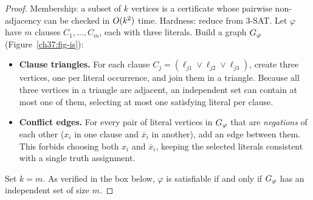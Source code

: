 \begin{proof}
Membership: a subset of $k$ vertices is a certificate whose pairwise non-adjacency can be checked
in $O(k^2)$ time. Hardness: reduce from \textsc{3-SAT}. Let $\varphi$ have $m$
clauses $C_1,\dots,C_m$, each with three literals. Build a graph $G_\varphi$ (Figure~\ref{ch37:fig-is}):

\begin{itemize}
  \item \textbf{Clause triangles.} For each clause $C_j=(\ell_{j1}\vee
        \ell_{j2}\vee \ell_{j3})$, create three vertices, one per literal
        occurrence, and join them in a triangle. Because all three vertices in a triangle are adjacent, an independent set can contain at most one of them, selecting at most one
        satisfying literal per clause.
  \item \textbf{Conflict edges.} For every pair of literal vertices in $G_\varphi$ that are
        \emph{negations} of each other ($x_i$ in one clause and $\bar{x}_i$ in
        another), add an edge between them. This forbids choosing both $x_i$ and $\bar{x}_i$,
        keeping the selected literals consistent with a single truth assignment.
\end{itemize}

Set $k=m$. As verified in the box below, $\varphi$ is satisfiable if and only if $G_\varphi$ has an
independent set of size $m$.
\end{proof}

